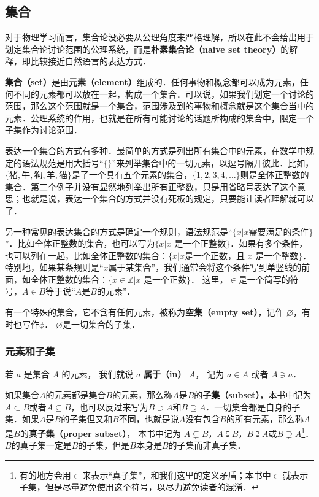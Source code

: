 
\subsection{集合}

对于物理学习而言，集合论没必要从公理角度来严格理解，所以在此不会给出用于划定集合论讨论范围的公理系统，而是\textbf{朴素集合论（naive set theory）}的解释，即比较接近自然语言的表达方式．

\textbf{集合（set）}是由\textbf{元素（element）}组成的．任何事物和概念都可以成为元素，任何不同的元素都可以放在一起，构成一个集合．可以说，如果我们划定一个讨论的范围，那么这个范围就是一个集合，范围涉及到的事物和概念就是这个集合当中的元素．公理系统的作用，也就是在所有可能讨论的话题所构成的集合中，限定一个子集作为讨论范围．

表达一个集合的方式有多种．最简单的方式是列出所有集合中的元素，在数学中规定的语法规范是用大括号“$\{\}$”来列举集合中的一切元素，以逗号隔开彼此．比如，$\{\text{猪}, \text{牛}, \text{狗}, \text{羊}, \text{猫}\}$是了一个具有五个元素的集合，$\{1,2,3,4,\dots\}$则是全体正整数的集合．第二个例子并没有显然地列举出所有正整数，只是用省略号表达了这个意思；也就是说，表达一个集合的方式并没有死板的规定，只要能让读者理解就可以了．

另一种常见的表达集合的方式是确定一个规则，语法规范是“$\{x|x \text{需要满足的条件}\}$”．比如全体正整数的集合，也可以写为$\{x|\text{$x$ 是一个正整数}\}$．如果有多个条件，也可以列在一起，比如全体正整数的集合：$\{x|x \text{是一个正数，且 $x$ 是一个整数}\}$．特别地，如果某条规则是“$x$属于某集合”，我们通常会将这个条件写到单竖线的前面，如全体正整数的集合：$\{x\in\mathbb{Z}|\text{$x$ 是一个正数}\}$． 这里，$\in$是一个简写的符号，$A\in B$等于说“$A$是$B$的元素”．

有一个特殊的集合，它不含有任何元素，被称为\textbf{空集（empty set）}，记作 $\varnothing$，有时也写作$\phi$． $\varnothing$是一切集合的子集．

\subsubsection{元素和子集}
若 $a$ 是集合 $A$ 的元素， 我们就说 $a$ \textbf{属于（in）} $A$， 记为 $a \in A$ 或者 $A \ni a$．

如果集合$A$的元素都是集合$B$的元素，那么称$A$是$B$的\textbf{子集（subset）}，本书中记为$A\subset B$或者$A\subseteq B$，也可以反过来写为$B\supset A$和$B\supseteq A$．一切集合都是自身的子集．如果$A$是$B$的子集但又和$B$不同，也就是说$A$没有包含$B$的所有元素，那么称$A$是$B$的\textbf{真子集（proper subset）}， 本书中记为 $A\subsetneq B$，$A\subsetneqq B$，$B\supsetneqq A$或$B\supsetneq A$\footnote{有的地方会用$\subset$来表示“真子集”，和我们这里的定义矛盾；本书中$\subset$就表示子集，但是尽量避免使用这个符号，以尽力避免读者的混淆．}．$B$的真子集一定是$B$的子集，但是$B$本身是$B$的子集而非真子集．

